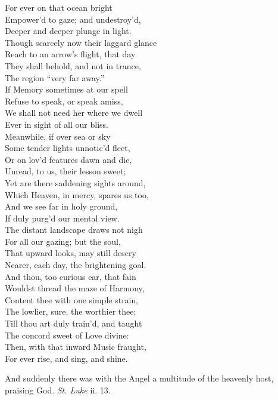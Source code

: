  For ever on that ocean bright \\
 Empower’d to gaze; and undestroy’d, \\
 Deeper and deeper plunge in light. \\
  Though scarcely now their laggard glance \\
 Reach to an arrow’s flight, that day \\
 They shall behold, and not in trance, \\
 The region “very far away.” \\
  If Memory sometimes at our spell \\
 Refuse to speak, or speak amiss, \\
 We shall not need her where we dwell \\
 Ever in sight of all our bliss. \\
  Meanwhile, if over sea or sky \\
 Some tender lights unnotic’d fleet, \\
 Or on lov’d features dawn and die, \\
 Unread, to us, their lesson sweet; \\
  Yet are there saddening sights around, \\
 Which Heaven, in mercy, spares us too, \\
 And we see far in holy ground, \\
 If duly purg’d our mental view. \\
  The distant landscape draws not nigh \\
 For all our gazing; but the soul, \\
 That upward looks, may still descry \\
 Nearer, each day, the brightening goal. \\
  And thou, too curious ear, that fain \\
 Wouldst thread the maze of Harmony, \\
 Content thee with one simple strain, \\
 The lowlier, sure, the worthier thee; \\
  Till thou art duly train’d, and taught \\
 The concord sweet of Love divine: \\
 Then, with that inward Music fraught, \\
 For ever rise, and sing, and shine.\\


And suddenly there was with the Angel a multitude of the heavenly host, praising God. \emph{St. Luke} ii. 13.

